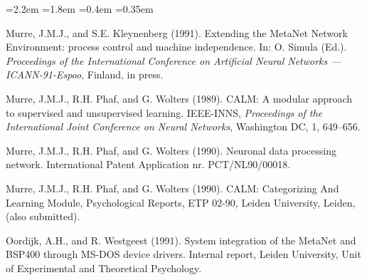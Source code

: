 \documentclass[11pt, a4paper]{article}
\begin{document}
\begin{list}{}{\leftmargin=2.2em =1.8em =0.4em \itemsep=0.35em \parsep=0pt \small}
  \item[{[9]}] Murre, J.M.J., and S.E. Kleynenberg (1991). Extending the MetaNet Network Environment: process control and machine independence. In: O. Simula (Ed.). \textit{Proceedings of the International Conference on Artificial Neural Networks --- ICANN-91-Espoo}, Finland, in press.
  \item[{[10]}] Murre, J.M.J., R.H. Phaf, and G. Wolters (1989). CALM: A modular approach to supervised and unsupervised learning. IEEE-INNS, \textit{Proceedings of the International Joint Conference on Neural Networks}, Washington DC, 1, 649--656.
  \item[{[11]}] Murre, J.M.J., R.H. Phaf, and G. Wolters (1990). Neuronal data processing network. International Patent Application nr. PCT/NL90/00018.
  \item[{[12]}] Murre, J.M.J., R.H. Phaf, and G. Wolters (1990). CALM: Categorizing And Learning Module, Psychological Reports, ETP 02-90, Leiden University, Leiden, (also submitted).
  \item[{[13]}] Oordijk, A.H., and R. Westgeest (1991). System integration of the MetaNet and BSP400 through MS-DOS device drivers. Internal report, Leiden University, Unit of Experimental and Theoretical Psychology.
\end{list}
\end{document}
